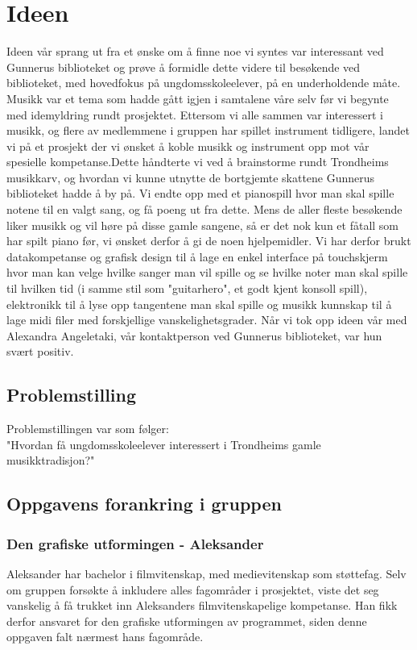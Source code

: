 \chapter {Ideen}
Ideen vår sprang ut fra et ønske om å finne noe vi syntes var interessant ved Gunnerus biblioteket og prøve å formidle dette videre til besøkende ved biblioteket, med hovedfokus på ungdomsskoleelever, på en underholdende måte. Musikk var et tema som hadde gått igjen i samtalene våre selv før vi begynte med idemyldring rundt prosjektet. Ettersom vi alle sammen var interessert i musikk, og flere av medlemmene i gruppen har spillet instrument tidligere, landet vi på et prosjekt der vi ønsket å koble musikk og instrument opp mot vår spesielle kompetanse.Dette håndterte vi ved å brainstorme rundt Trondheims musikkarv, og hvordan vi kunne utnytte de bortgjemte skattene Gunnerus biblioteket hadde å by på. Vi endte opp med et pianospill hvor man skal spille notene til en valgt sang, og få poeng ut fra dette. Mens de aller fleste besøkende liker musikk og vil høre på disse gamle sangene, så er det nok kun et fåtall som har spilt piano før, vi ønsket derfor å gi de noen hjelpemidler. Vi har derfor brukt datakompetanse og grafisk design til å lage en enkel interface på touchskjerm hvor man kan velge hvilke sanger man vil spille og se hvilke noter man skal spille til hvilken tid (i samme stil som "guitarhero", et godt kjent konsoll spill), elektronikk til å lyse opp tangentene man skal spille og musikk kunnskap til å lage midi filer med forskjellige vanskelighetsgrader. Når vi tok opp ideen vår med Alexandra Angeletaki, vår kontaktperson ved Gunnerus biblioteket, var hun svært positiv.

\section{Problemstilling}
Problemstillingen var som følger:\\"Hvordan få ungdomsskoleelever interessert i Trondheims gamle musikktradisjon?"

\section{Oppgavens forankring i gruppen}
\subsection{Den grafiske utformingen - Aleksander}
Aleksander har bachelor i filmvitenskap, med medievitenskap som støttefag. Selv om gruppen forsøkte å inkludere alles fagområder i prosjektet, viste det seg vanskelig å få trukket inn Aleksanders filmvitenskapelige kompetanse. Han fikk derfor ansvaret for den grafiske utformingen av programmet, siden denne oppgaven falt nærmest hans fagområde.\\\\


